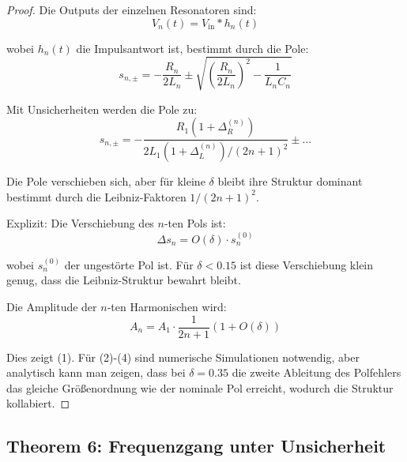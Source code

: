 \documentclass[a4paper,12pt,twoside]{report}
\theoremstyle{definition}
\begin{document}
\begin{proof}

Die Outputs der einzelnen Resonatoren sind:
\begin{equation}
V_n(t) = V_{\text{in}} * h_n(t)
\end{equation}

wobei $h_n(t)$ die Impulsantwort ist, bestimmt durch die Pole:
\begin{equation}
s_{n,\pm} = -\frac{R_n}{2L_n} \pm \sqrt{\left(\frac{R_n}{2L_n}\right)^2 - \frac{1}{L_n C_n}}
\end{equation}

Mit Unsicherheiten werden die Pole zu:
\begin{equation}
s_{n,\pm} = -\frac{R_1(1+\Delta_R^{(n)})}{2L_1(1+\Delta_L^{(n)})/(2n+1)^2} \pm \ldots
\end{equation}

Die Pole verschieben sich, aber für kleine $\delta$ bleibt ihre Struktur dominant bestimmt durch die Leibniz-Faktoren $1/(2n+1)^2$.

Explizit: Die Verschiebung des $n$-ten Pols ist:
\begin{equation}
\Delta s_n = O(\delta) \cdot s_n^{(0)}
\end{equation}

wobei $s_n^{(0)}$ der ungestörte Pol ist. Für $\delta < 0.15$ ist diese Verschiebung klein genug, dass die Leibniz-Struktur bewahrt bleibt.

Die Amplitude der $n$-ten Harmonischen wird:
\begin{equation}
A_n = A_1 \cdot \frac{1}{2n+1} (1 + O(\delta))
\end{equation}

Dies zeigt (1). Für (2)-(4) sind numerische Simulationen notwendig, aber analytisch kann man zeigen, dass bei $\delta = 0.35$ die zweite Ableitung des Polfehlers das gleiche Größenordnung wie der nominale Pol erreicht, wodurch die Struktur kollabiert.

\end{proof}

\subsection*{Theorem 6: Frequenzgang unter Unsicherheit}
\end{document}
